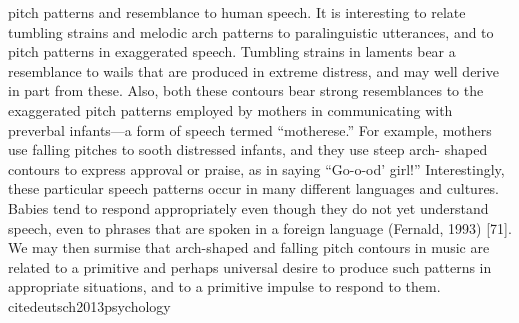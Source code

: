 pitch patterns and resemblance to human speech. It is interesting to relate tumbling strains and melodic arch patterns to paralinguistic utterances, and to pitch patterns in exaggerated speech. Tumbling strains in laments bear a resemblance to wails that are produced in extreme distress, and may well derive in part from these. Also, both these contours bear strong resemblances to the exaggerated pitch patterns employed by mothers in communicating with preverbal infants—a form of speech termed “motherese.” For example, mothers use falling pitches to sooth distressed infants, and they use steep arch- shaped contours to express approval or praise, as in saying “Go-o-od’ girl!” Interestingly, these particular speech patterns occur in many different languages and cultures. Babies tend to respond appropriately even though they do not yet understand speech, even to phrases that are spoken in a foreign language (Fernald, 1993) [71]. We may then surmise that arch-shaped and falling pitch contours in music are related to a primitive and perhaps universal desire to produce such patterns in appropriate situations, and to a primitive impulse to respond to them. cite{deutsch2013psychology}

